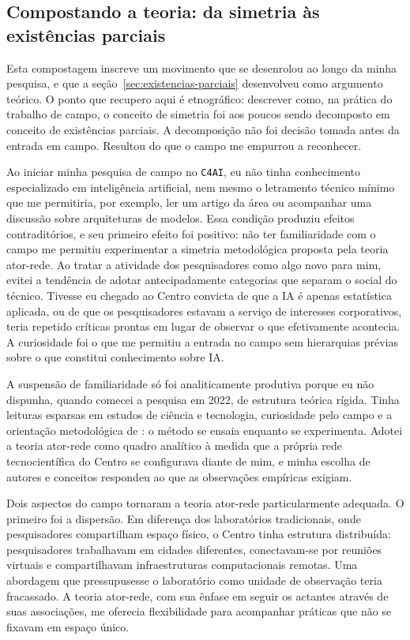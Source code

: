 \subsection{Compostando a teoria: da simetria às existências parciais}
\label{subsec:compostagem2}

Esta compostagem inscreve um movimento que se desenrolou ao longo da minha pesquisa, e que a seção~\ref{sec:existencias-parciais} desenvolveu como argumento teórico. O ponto que recupero aqui é etnográfico: descrever como, na prática do trabalho de campo, o conceito de simetria foi aos poucos sendo decomposto em conceito de existências parciais. A decomposição não foi decisão tomada antes da entrada em campo. Resultou do que o campo me empurrou a reconhecer.

Ao iniciar minha pesquisa de campo no \texttt{C4AI}, eu não tinha conhecimento especializado em inteligência artificial, nem mesmo o letramento técnico mínimo que me permitiria, por exemplo, ler um artigo da área ou acompanhar uma discussão sobre arquiteturas de modelos. Essa condição produziu efeitos contraditórios, e seu primeiro efeito foi positivo: não ter familiaridade com o campo me permitiu experimentar a simetria metodológica proposta pela teoria ator-rede. Ao tratar a atividade dos pesquisadores como algo novo para mim, evitei a tendência de adotar antecipadamente categorias que separam o social do técnico. Tivesse eu chegado ao Centro convicta de que a IA é apenas estatística aplicada, ou de que os pesquisadores estavam a serviço de interesses corporativos, teria repetido críticas prontas em lugar de observar o que efetivamente acontecia. A curiosidade foi o que me permitiu a entrada no campo sem hierarquias prévias sobre o que constitui conhecimento sobre IA.

A suspensão de familiaridade só foi analiticamente produtiva porque eu não dispunha, quando comecei a pesquisa em 2022, de estrutura teórica rígida. Tinha leituras esparsas em estudos de ciência e tecnologia, curiosidade pelo campo e a orientação metodológica de \textcite{Kofes2015Maconaria}: o método se ensaia enquanto se experimenta. Adotei a teoria ator-rede como quadro analítico à medida que a própria rede tecnocientífica do Centro se configurava diante de mim, e minha escolha de autores e conceitos respondeu ao que as observações empíricas exigiam.

Dois aspectos do campo tornaram a teoria ator-rede particularmente adequada. O primeiro foi a dispersão. Em diferença dos laboratórios tradicionais, onde pesquisadores compartilham espaço físico, o Centro tinha estrutura distribuída: pesquisadores trabalhavam em cidades diferentes, conectavam-se por reuniões virtuais e compartilhavam infraestruturas computacionais remotas. Uma abordagem que pressupusesse o laboratório como unidade de observação teria fracassado. A teoria ator-rede, com sua ênfase em seguir os actantes através de suas associações, me oferecia flexibilidade para acompanhar práticas que não se fixavam em espaço único.

